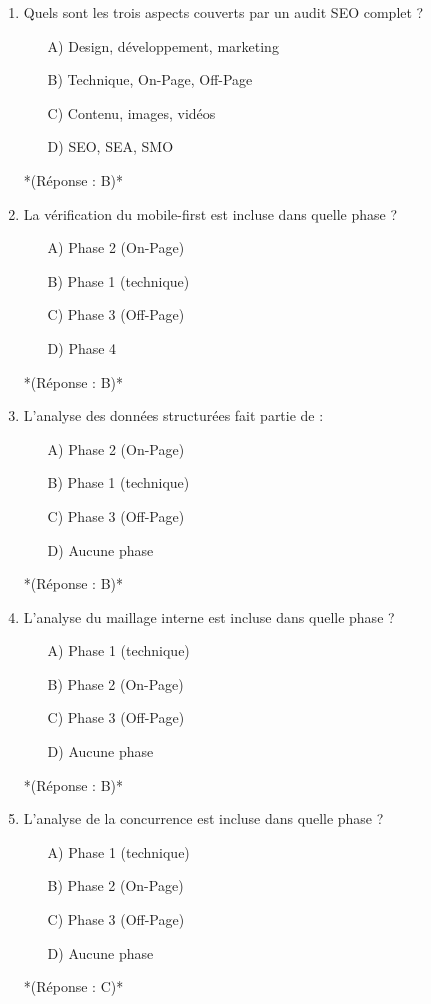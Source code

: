 \documentclass[12pt,a4paper,twoside]{report}
\begin{document}
\begin{enumerate}
    \item Quels sont les trois aspects couverts par un audit SEO complet ?
    \begin{itemize}
        \item[A)] Design, développement, marketing
        \item[B)] Technique, On-Page, Off-Page
        \item[C)] Contenu, images, vidéos
        \item[D)] SEO, SEA, SMO
    \end{itemize}
    *(Réponse : B)*

    \item La vérification du mobile-first est incluse dans quelle phase ?
    \begin{itemize}
        \item[A)] Phase 2 (On-Page)
        \item[B)] Phase 1 (technique)
        \item[C)] Phase 3 (Off-Page)
        \item[D)] Phase 4
    \end{itemize}
    *(Réponse : B)*

    \item L'analyse des données structurées fait partie de :
    \begin{itemize}
        \item[A)] Phase 2 (On-Page)
        \item[B)] Phase 1 (technique)
        \item[C)] Phase 3 (Off-Page)
        \item[D)] Aucune phase
    \end{itemize}
    *(Réponse : B)*

    \item L'analyse du maillage interne est incluse dans quelle phase ?
    \begin{itemize}
        \item[A)] Phase 1 (technique)
        \item[B)] Phase 2 (On-Page)
        \item[C)] Phase 3 (Off-Page)
        \item[D)] Aucune phase
    \end{itemize}
    *(Réponse : B)*

    \item L'analyse de la concurrence est incluse dans quelle phase ?
    \begin{itemize}
        \item[A)] Phase 1 (technique)
        \item[B)] Phase 2 (On-Page)
        \item[C)] Phase 3 (Off-Page)
        \item[D)] Aucune phase
    \end{itemize}
    *(Réponse : C)*


\end{enumerate}
\end{document}
